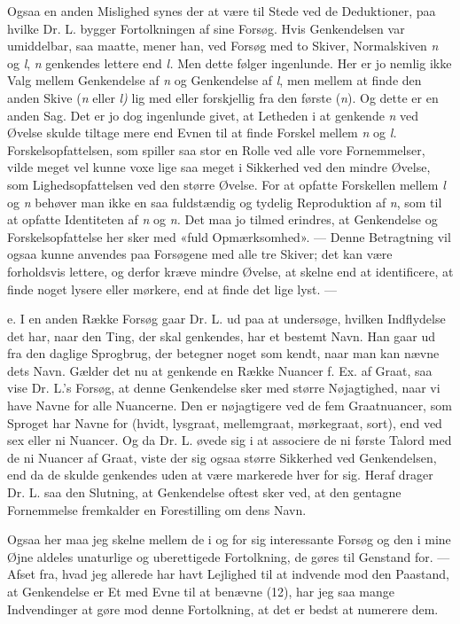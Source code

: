 \documentclass[12pt,a4paper,openany]{book}
\newcommand{\opage}[1]{\marginnote{\footnotesize\textit{[#1]}}}
\begin{document}
Ogsaa en anden Mislighed synes der at være til Stede ved de Deduktioner, paa
hvilke Dr. L. bygger Fortolkningen af sine Forsøg. Hvis Genkendelsen var
umiddelbar, saa maatte, mener han, ved Forsøg med to Skiver, Normalskiven
\textit{n} og \textit{l}, \textit{n} genkendes lettere end \textit{l.} Men
dette følger ingenlunde. Her er jo nemlig ikke Valg mellem Genkendelse af
\textit{n} og Genkendelse af \textit{l}, men mellem at finde den anden Skive
(\textit{n} eller \textit{l)} lig med eller forskjellig fra den første
(\textit{n}). Og dette er en anden Sag. Det er jo dog ingenlunde givet, at
Letheden i at genkende \textit{n} ved Øvelse skulde tiltage mere end Evnen til
at finde Forskel mellem \textit{n} og \textit{l.} Forskelsopfattelsen, som
spiller saa stor en Rolle ved alle vore Fornemmelser, vilde meget vel kunne
voxe lige saa meget i Sikkerhed ved den mindre Øvelse, som Lighedsopfattelsen
ved den større Øvelse. For at opfatte Forskellen mellem \textit{l} og
\textit{n} behøver man ikke en saa fuldstændig og tydelig Reproduktion af
\textit{n}, som til at opfatte Identiteten af \textit{n} og \textit{n.} Det maa
jo tilmed erindres, at Genkendelse og Forskelsopfattelse her sker med «fuld
Opmærksomhed». --- Denne Betragtning vil ogsaa kunne anvendes paa Forsøgene med
alle tre Skiver; det kan være forholdsvis lettere, og derfor kræve mindre
Øvelse, at skelne end at identificere, at finde noget lysere eller mørkere, end
at finde det lige lyst. ---

e. I en anden Række Forsøg gaar Dr. L. ud paa at undersøge, hvilken Indflydelse
det har, naar den Ting, der skal genkendes, har et bestemt Navn. Han gaar ud
fra den daglige Sprogbrug, der betegner noget som kendt, naar man kan nævne
dets Navn. Gælder det nu at genkende en Række Nuancer f. Ex. af Graat, saa vise
Dr. L.'s Forsøg, at denne Genkendelse sker med større Nøjagtighed, naar vi have
Navne for alle Nuancerne. Den er nøjagtigere ved de fem Graatnuancer, som
Sproget har Navne for (hvidt, lysgraat, mellemgraat, mørkegraat, sort), end ved
sex eller ni Nuancer. Og da Dr. L. øvede sig i at associere de ni første Talord
med de ni Nuancer af Graat, viste der sig ogsaa større Sikkerhed ved
Genkendelsen, end da de skulde genkendes uden at være markerede hver for sig.
Heraf drager Dr. L. saa den Slutning, at Genkendelse oftest sker ved, at den
gentagne Fornemmelse fremkalder en Forestilling om dens Navn.

\setcounter{footnote}{0}%
\opage{34}Ogsaa her maa jeg skelne mellem de i og for sig interessante Forsøg
og den i mine Øjne aldeles unaturlige og uberettigede Fortolkning, de gøres til
Genstand for. --- Afset fra, hvad jeg allerede har havt Lejlighed til at
indvende mod den Paastand, at Genkendelse er Et med Evne til at benævne (12),
har jeg saa mange Indvendinger at gøre mod denne Fortolkning, at det er bedst
at numerere dem.
\end{document}
